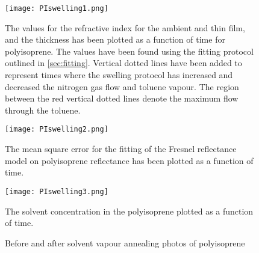 \documentclass[MasterThesisMain.tex]{subfiles}
\begin{document}
\begin{figure}[H]
\centering
\texttt{[image: PIswelling1.png]}
\caption{The values for the refractive index for the ambient and thin film, and the thickness has been plotted as a function of time for polyisoprene. The values have been found using the fitting protocol outlined in \ref{sec:fitting}. Vertical dotted lines have been added to represent times where the swelling protocol has increased and decreased the nitrogen gas flow and toluene vapour. The region between the red vertical dotted lines denote the maximum flow through the toluene.}
\label{fig:PIswelling1}
\end{figure}

\begin{figure}[H]
\centering
\texttt{[image: PIswelling2.png]}
\caption{The mean square error for the fitting of the Fresnel reflectance model on polyisoprene reflectance has been plotted as a function of time.}
\label{fig:PIswelling2}
\end{figure}

\begin{figure}[H]
\centering
\texttt{[image: PIswelling3.png]}
\caption{The solvent concentration in the polyisoprene plotted as a function of time.}
\label{fig:PIswelling3}
\end{figure}

\begin{figure}
\centering     
{}
\caption{Before and after solvent vapour annealing photos of polyisoprene}
\end{figure}
	
\end{document}
